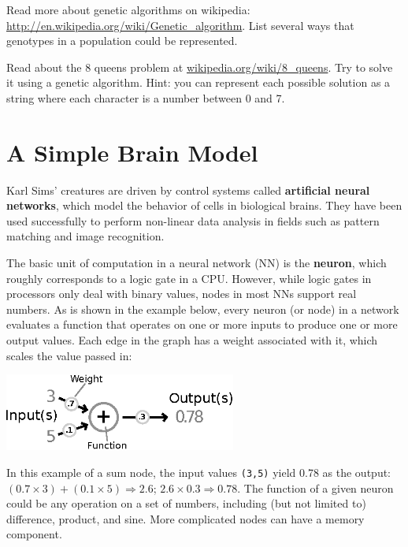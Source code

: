 \begin{ex}
  Read more about genetic algorithms on wikipedia: 
  \url{http://en.wikipedia.org/wiki/Genetic_algorithm}. List several ways that 
  genotypes in a population could be represented.
\end{ex}

\begin{ex}
  Read about the 8 queens problem at \url{wikipedia.org/wiki/8_queens}.
  Try to solve it using a genetic algorithm. Hint: you can represent
  each possible solution as a string where each character is a number
  between 0 and 7.
\end{ex}

\section{A Simple Brain Model}

Karl Sims' creatures are driven by control systems called {\bf artificial neural
networks}, which model the behavior of cells in biological brains. They 
have been used successfully to perform non-linear data analysis in fields such as
pattern matching and image recognition.

The basic unit of computation in a neural network (NN) is the {\bf neuron}, which
roughly corresponds to a logic gate in a CPU. However, while logic gates in 
processors only deal with binary values, nodes in most NNs support real numbers.
As is shown in the example below, every neuron (or node) in a network evaluates a 
function that operates on one or more inputs to produce one or more output values. 
Each edge in the graph has a weight associated with it, which scales the value passed in: %

\beforefig
\centerline{\includegraphics[width=3in]{./pycritters_figs/Neuron.eps}}
\afterfig

In this example of a sum node, the input values {\tt (3,5)} yield 0.78 as the output: 
$(0.7\times 3)+(0.1\times 5) \Rightarrow 2.6$; $2.6 \times 0.3 \Rightarrow 0.78$. 
The function of a given neuron could be any operation on a set of numbers, including 
(but not limited to) difference, product, and sine. More complicated nodes can 
have a memory component. %

